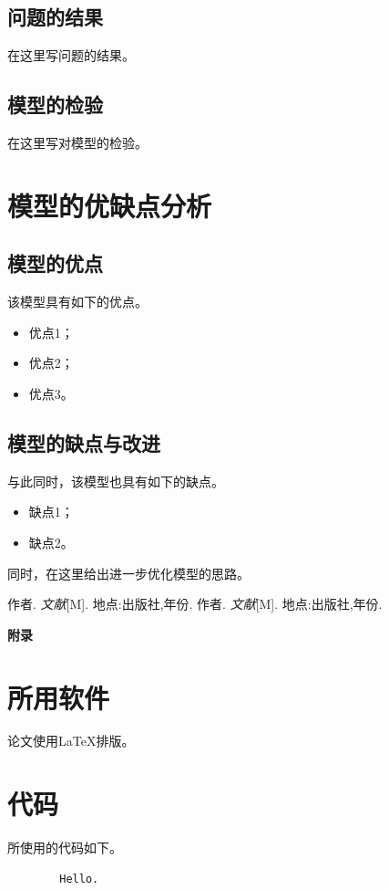 \documentclass[12pt, a4paper, oneside]{ctexart}
\renewcommand{\thesection}{\zhnum{section}} %
\begin{document}
    \subsection{问题的结果}

    在这里写问题的结果。

    \subsection{模型的检验}

    在这里写对模型的检验。

    \section{模型的优缺点分析}

    \subsection{模型的优点}

    该模型具有如下的优点。
    \begin{itemize}
        \item 优点1；
        \item 优点2；
        \item 优点3。
    \end{itemize}

    \subsection{模型的缺点与改进}

    与此同时，该模型也具有如下的缺点。
    \begin{itemize}
        \item 缺点1；
        \item 缺点2。
    \end{itemize}
    同时，在这里给出进一步优化模型的思路。

    \begin{thebibliography}{99}
        作者. \emph{文献}[M]. 地点:出版社,年份.
        作者. \emph{文献}[M]. 地点:出版社,年份.
    \end{thebibliography}

    \begin{center}
        \Large{\textbf{附录}}
    \end{center}

    \begin{appendices}
        \renewcommand{\thesection}{\Alph{section}}
        \section{所用软件}
            论文使用\LaTeX 排版。
        \section{代码}
            所使用的代码如下。
    \begin{lstlisting}
        Hello. 
    \end{lstlisting}
    \end{appendices}
\end{document}
